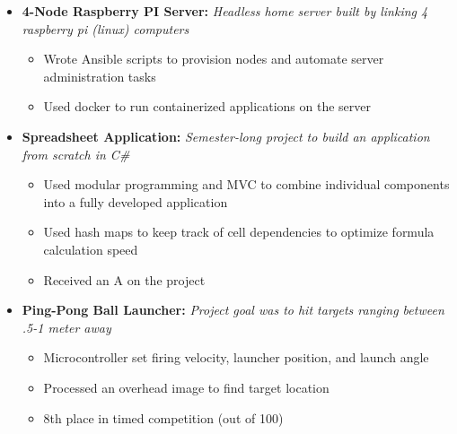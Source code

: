 \documentclass{article}
\begin{document}
\begin{itemize}
    \item \textbf{4-Node Raspberry PI Server:}
    \textit{Headless home server built by linking 4 raspberry pi (linux) computers}
    \begin{itemize}
        \item Wrote Ansible scripts to provision nodes and automate server administration tasks
        \item Used docker to run containerized applications on the server
    \end{itemize}
\end{itemize}
\vspace{2mm}
\begin{itemize}
    \item \textbf{Spreadsheet Application:}
    \textit{Semester-long project to build an application from scratch in C\#}
    \begin{itemize}
        \item Used modular programming and MVC to combine individual components into a fully developed application
        \item Used hash maps to keep track of cell dependencies to optimize formula calculation speed
        \item Received an A on the project
    \end{itemize}
\vspace{2mm}
    \item \textbf{Ping-Pong Ball Launcher:}
        \textit{Project goal was to hit targets ranging between .5-1 meter away}
        \begin{itemize}
            \item Microcontroller set firing velocity, launcher position, and launch angle
            \item Processed an overhead image to find target location
            \item 8th place in timed competition (out of 100)
        \end{itemize}
\end{itemize}


\end{document}
